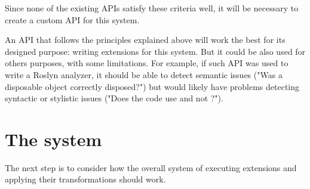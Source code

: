 Since none of the existing \acp{API} satisfy these criteria well, it will be necessary to create a custom \ac{API} for this system.

An \ac{API} that follows the principles explained above will work the best for its designed purpose: writing extensions for this system. But it could be also used for others purposes, with some limitations. For example, if such \ac{API} was used to write a Roslyn analyzer, it should be able to detect semantic issues ("Was a disposable object correctly disposed?") but would likely have problems detecting syntactic or stylistic issues ("Does the code use  and not ?").

\section{The system}

The next step is to consider how the overall system of executing extensions and applying their transformations should work.

